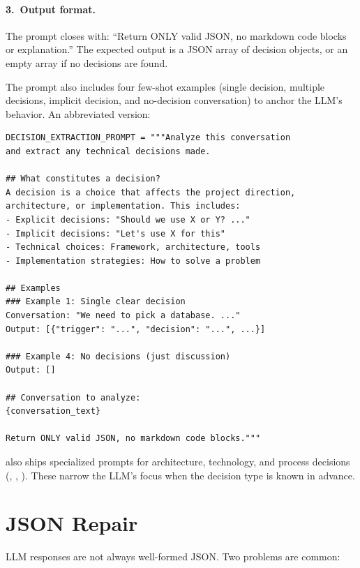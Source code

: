 \paragraph{3.\ Output format.}
The prompt closes with: ``Return ONLY valid JSON, no markdown code blocks
or explanation.''  The expected output is a JSON array of decision objects,
or an empty array \ic{[]} if no decisions are found.

The prompt also includes four few-shot examples (single decision, multiple
decisions, implicit decision, and no-decision conversation) to anchor the
LLM's behavior.  An abbreviated version:

\begin{lstlisting}[style=python, caption={Abbreviated extraction prompt (see extractor.py for the full version).}]
DECISION_EXTRACTION_PROMPT = """Analyze this conversation
and extract any technical decisions made.

## What constitutes a decision?
A decision is a choice that affects the project direction,
architecture, or implementation. This includes:
- Explicit decisions: "Should we use X or Y? ..."
- Implicit decisions: "Let's use X for this"
- Technical choices: Framework, architecture, tools
- Implementation strategies: How to solve a problem

## Examples
### Example 1: Single clear decision
Conversation: "We need to pick a database. ..."
Output: [{"trigger": "...", "decision": "...", ...}]

### Example 4: No decisions (just discussion)
Output: []

## Conversation to analyze:
{conversation_text}

Return ONLY valid JSON, no markdown code blocks."""
\end{lstlisting}

\sysname{} also ships specialized prompts for architecture, technology,
and process decisions (,
, ).
These narrow the LLM's focus when the decision type is known in advance.


\section{JSON Repair}
\label{sec:json-repair}

LLM responses are not always well-formed JSON.  Two problems are common:

